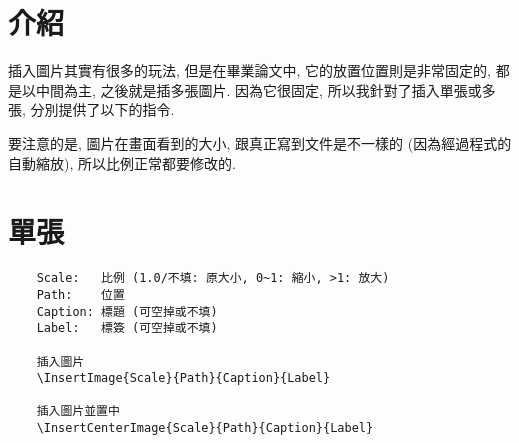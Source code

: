 \section{介紹}

插入圖片其實有很多的玩法, 但是在畢業論文中, 它的放置位置則是非常固定的, 都是以中間為主, 之後就是插多張圖片. 因為它很固定, 所以我針對了插入單張或多張, 分別提供了以下的指令.

要注意的是, 圖片在畫面看到的大小, 跟真正寫到文件是不一樣的 (因為經過程式的自動縮放), 所以比例正常都要修改的.

\section{單張}

  \begin{framed}
  \begin{verbatim}
    Scale:   比例 (1.0/不填: 原大小, 0~1: 縮小, >1: 放大)
    Path:    位置
    Caption: 標題 (可空掉或不填)
    Label:   標簽 (可空掉或不填)

    插入圖片
    \InsertImage{Scale}{Path}{Caption}{Label}

    插入圖片並置中
    \InsertCenterImage{Scale}{Path}{Caption}{Label}
  \end{verbatim}
  \end{framed}

  \newpage

